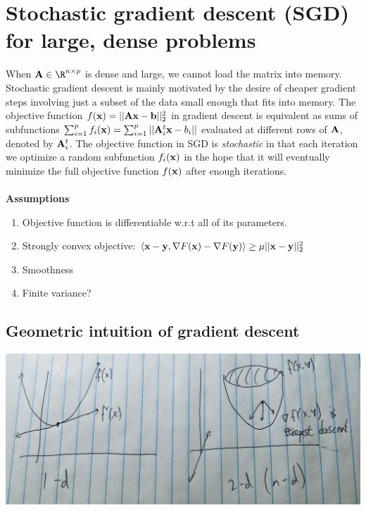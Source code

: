 \documentclass[./some_latex_template.tex]{subfiles}
\begin{document}
\section{Stochastic gradient descent (SGD) for large, dense problems}

When $\bA \in \R^{n \times p}$ is dense and large, we cannot load the matrix into memory. Stochastic gradient descent is mainly motivated by the desire of cheaper gradient steps involving just a subset of the data small enough that fits into memory. The objective function $f(\mathbf{x}) = ||\mathbf{A}\mathbf{x} - \mathbf{b}||^2_2$ in gradient descent is equivalent as sums of subfunctions $\sum_{i = 1}^p f_i(\mathbf{x}) = \sum_{i = 1}^p ||\mathbf{A}_i^t\mathbf{x} - b_i||$ evaluated at different rows of $\mathbf{A}$, denoted by $\mathbf{A}_i^t$. The objective function in SGD is \textit{stochastic} in that each iteration we optimize a random subfunction $f_i(\mathbf{x})$ in the hope that it will eventually minimize the full objective function $f(\mathbf{x})$ after enough iterations. \\
\\
\textbf{Assumptions}
\begin{enumerate}
	\item Objective function is differentiable w.r.t all of its parameters.  
	\item Strongly convex objective: $\left< \mathbf{x} - \mathbf{y}, \nabla F(\mathbf{x}) - \nabla F(\mathbf{y}) \right> \ge \mu ||\mathbf{x} - \mathbf{y}||^2_2$
	\item Smoothness
	\item Finite variance?
\end{enumerate}

\subsection{Geometric intuition of gradient descent}

\begin{center}
	\includegraphics[scale=0.1]{gradient_illustration.jpg}
\end{center}
\end{document}

